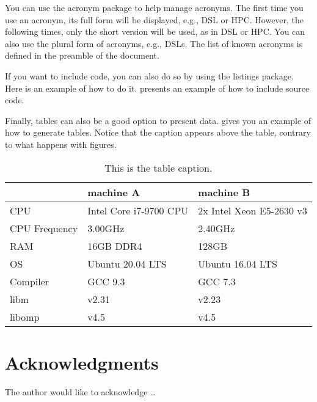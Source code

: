 \documentclass[sigconf,balance,nonacm,authordraft]{acmart}
\begin{document}
You can use the acronym package to help manage acronyms. The first time you use an acronym, its full form will be displayed, e.g., \ac{DSL} or \ac{HPC}. However, the following times, only the short version will be used, as in \ac{DSL} or \ac{HPC}. You can also use the plural form of acronyms, e.g., \acp{DSL}. The list of known acronyms is defined in the preamble of the document.



If you want to include code, you can also do so by using the listings package. Here is an example of how to do it.  presents an example of how to include source code.

Finally, tables can also be a good option to present data.  gives you an example of how to generate tables. Notice that the caption appears above the table, contrary to what happens with figures.

\begin{table}[b]
\caption{This is the table caption.}
\label{tab:table1}
\footnotesize
\begin{tabular}{lll}
\toprule
         & machine A                   & machine B                           \\
\midrule
CPU      & Intel Core i7-9700 CPU      & 2x Intel Xeon E5-2630 v3            \\
CPU Frequency& 3.00GHz                     & 2.40GHz                             \\
RAM      & 16GB DDR4                   & 128GB                               \\
OS       & Ubuntu 20.04 LTS            & Ubuntu 16.04 LTS                    \\
Compiler & GCC 9.3                     & GCC 7.3                             \\
libm     & v2.31                       & v2.23                               \\
libomp   & v4.5                        & v4.5                                \\
\bottomrule
\end{tabular}
\end{table}

\section*{Acknowledgments}
The author would like to acknowledge \ldots



\end{document}
